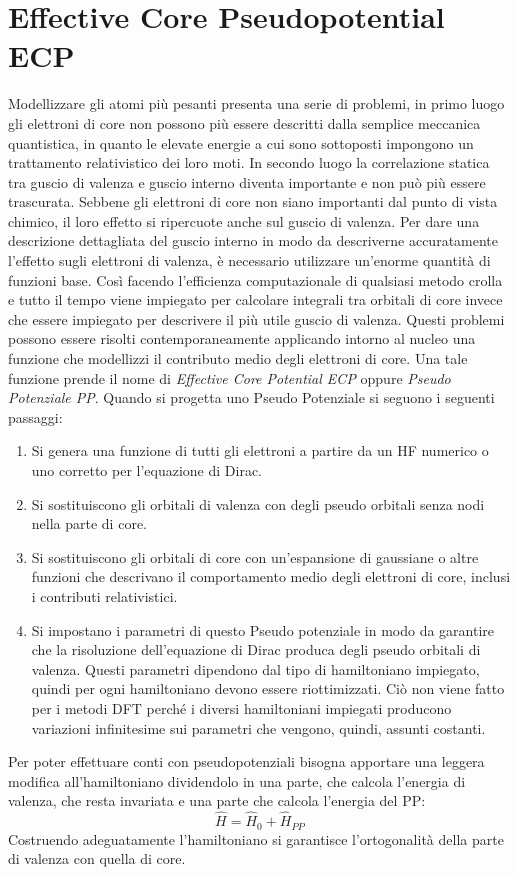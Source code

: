 \documentclass[oneside]{amsbook}
\numberwithin{section}{chapter}
\numberwithin{equation}{section}
\numberwithin{figure}{section}
\begin{document}
\section{Effective Core Pseudopotential ECP}
Modellizzare gli atomi più pesanti presenta una serie di problemi, in primo luogo gli elettroni di core non possono più essere descritti dalla semplice meccanica quantistica, in quanto le elevate energie a cui sono sottoposti impongono un trattamento relativistico dei loro moti. In secondo luogo la correlazione statica tra guscio di valenza e guscio interno diventa importante e non può più essere trascurata. Sebbene gli elettroni di core non siano importanti dal punto di vista chimico, il loro effetto si ripercuote anche sul guscio di valenza. Per dare una descrizione dettagliata del guscio interno in modo da descriverne accuratamente l'effetto sugli elettroni di valenza, è necessario utilizzare un'enorme quantità di funzioni base. Così facendo l'efficienza computazionale di qualsiasi metodo crolla e tutto il tempo viene impiegato per calcolare integrali tra orbitali di core invece che essere impiegato per descrivere il più utile guscio di valenza.
Questi problemi possono essere risolti contemporaneamente applicando intorno al nucleo una funzione che modellizzi il contributo medio degli elettroni di core. Una tale funzione prende il nome di \emph{Effective Core Potential ECP} oppure \emph{Pseudo Potenziale PP}.
Quando si progetta uno Pseudo Potenziale si seguono i seguenti passaggi:
\begin{enumerate}
\item Si genera una funzione di tutti gli elettroni a partire da un HF numerico o uno corretto per l'equazione di Dirac.
\item Si sostituiscono gli orbitali di valenza con degli pseudo orbitali senza nodi nella parte di core.
\item Si sostituiscono gli orbitali di core con un'espansione di gaussiane o altre funzioni che descrivano il comportamento medio degli elettroni di core, inclusi i contributi relativistici.
\item Si impostano i parametri di questo Pseudo potenziale in modo da garantire che la risoluzione dell'equazione di Dirac produca degli pseudo orbitali di valenza. Questi parametri dipendono dal tipo di hamiltoniano impiegato, quindi per ogni hamiltoniano devono essere riottimizzati. Ciò non viene fatto per i metodi DFT perché i diversi hamiltoniani impiegati producono variazioni infinitesime sui parametri che vengono, quindi, assunti costanti.
\end{enumerate}
Per poter effettuare conti con pseudopotenziali bisogna apportare una leggera modifica all'hamiltoniano dividendolo in una parte, che calcola l'energia di valenza, che resta invariata e una parte che calcola l'energia del PP:
\begin{equation}
\hat{H}= \hat{H}_0 +\hat{H}_{PP}
\end{equation}
Costruendo adeguatamente l'hamiltoniano si garantisce l'ortogonalità della parte di valenza con quella di core.
\end{document}
